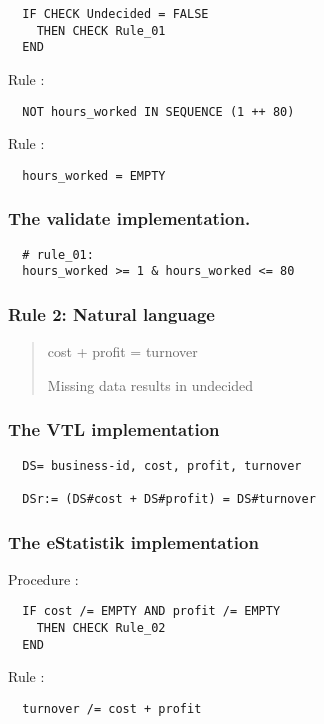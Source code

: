 \begin{verbatim}
  IF CHECK Undecided = FALSE  
    THEN CHECK Rule_01
  END
\end{verbatim}

\noindent
Rule :

\begin{verbatim}
  NOT hours_worked IN SEQUENCE (1 ++ 80)
\end{verbatim}

\noindent
Rule :

\begin{verbatim}
  hours_worked = EMPTY
\end{verbatim}

\subsubsection*{The validate implementation.}
\begin{verbatim}
  # rule_01:
  hours_worked >= 1 & hours_worked <= 80
\end{verbatim}


\newpage

\subsubsection*{  Rule 2: Natural language}
\begin{quote}


cost + profit = turnover

Missing data results in undecided



\end{quote}

\subsubsection*{The VTL implementation}
\begin{verbatim}
  DS= business-id, cost, profit, turnover

  DSr:= (DS#cost + DS#profit) = DS#turnover
\end{verbatim}

\subsubsection*{The eStatistik implementation}
\noindent
Procedure :
\begin{verbatim}
  IF cost /= EMPTY AND profit /= EMPTY 
    THEN CHECK Rule_02
  END
\end{verbatim}
Rule :
\begin{verbatim}
  turnover /= cost + profit
\end{verbatim}

